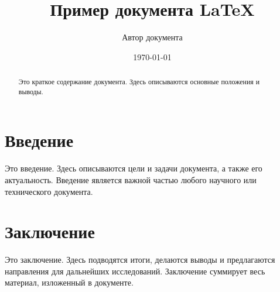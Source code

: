 \documentclass{article}
\title{Пример документа LaTeX}
\author{Автор документа}
\date{\today}
\begin{document}
\maketitle

\begin{abstract}
Это краткое содержание документа. Здесь описываются основные положения и выводы.
\end{abstract}

\section{Введение}

Это введение. Здесь описываются цели и задачи документа, а также его актуальность. Введение является важной частью любого научного или технического документа.

\section{Заключение}

Это заключение. Здесь подводятся итоги, делаются выводы и предлагаются направления для дальнейших исследований. Заключение суммирует весь материал, изложенный в документе.
\end{document}
